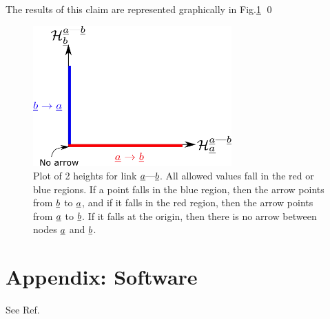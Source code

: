 \documentclass[12pt]{article}
\newcommand{\linkab }[0]{{\rva\text{---}\rvb}}
\begin{document}
The results of this claim
are represented graphically in 
Fig.\ref{fig-heights-x-y}
\qed
\begin{figure}[h!]
\centering
\includegraphics[width=3in]
{heights-x-y.png}
\caption{Plot of 2 heights 
for link $\linkab$.
All allowed values 
fall in the
red or blue regions.
If a point falls in
the blue region, then the arrow 
points from ${\underline{b}}$ to ${\underline{a}}$,
and if it falls in the red region,
then
the arrow points from ${\underline{a}}$ to ${\underline{b}}$.
If it falls at the origin, then
there is no arrow between 
nodes ${\underline{a}}$ and ${\underline{b}}$. }
\label{fig-heights-x-y}
\end{figure}

\appendix

\section{Appendix: Software}
See Ref.\cite{dag-lie-detector}




\end{document}
